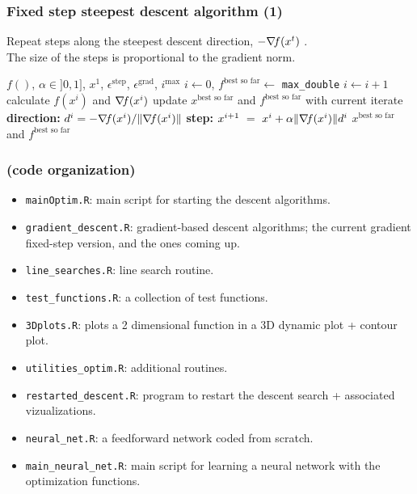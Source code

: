 \documentclass[12pt]{beamer}
\begin{document}
\begin{frame}
\frametitle{Fixed step steepest descent algorithm (1)} 
Repeat steps along the steepest descent direction, $-\nabla\!{f}(x^t)$ \cite{cauchy1847methode}. \\
The size of the steps is proportional to the gradient norm.
\begin{block}{}
\begin{algorithmic}
\REQUIRE $f()$, $\alpha \in ]0,1]$, $x^1$, $\epsilon^{\text{step}}$, $\epsilon^{\text{grad}}$, $i^{\text{max}}$
\STATE $i\leftarrow 0$, $f^{\text{best so far}} \leftarrow $ \texttt{max\_double}
\REPEAT 
\STATE $i \leftarrow i+1$
\STATE calculate $f(x^i)$ and $\nabla\!{f}(x^i)$
\STATE update $x^{\text{best so far}}$ and $f^{\text{best so far}}$ with current iterate
\ENDIF
\STATE \textbf{direction: } $d^i = - \nabla\!{f}(x^i) / \lVert \nabla\!{f}(x^i) \rVert$
\STATE \textbf{step: } $x^{i+1} ~=~ x^i + \alpha \lVert \nabla\!{f}(x^i) \rVert d^i$
\RETURN $x^{\text{best so far}}$ and $f^{\text{best so far}}$
\end{algorithmic}
\end{block}
\end{frame}

\begin{frame}
\frametitle{(code organization)} 
\begin{itemize}
\item \texttt{mainOptim.R}: main script for starting the descent algorithms.
\item \texttt{gradient\_descent.R}: gradient-based descent algorithms; the current gradient fixed-step version, and the ones coming up.
\item \texttt{line\_searches.R}: line search routine.
\item \texttt{test\_functions.R}: a collection of test functions.
\item \texttt{3Dplots.R}: plots a 2 dimensional function in a 3D dynamic plot + contour plot.
\item \texttt{utilities\_optim.R}: additional routines.
\item \texttt{restarted\_descent.R}: program to restart the descent search + associated vizualizations.
\item \texttt{neural\_net.R}: a feedforward network coded from scratch.
\item \texttt{main\_neural\_net.R}: main script for learning a neural network with the optimization functions.
\end{itemize}
\end{frame}
\end{document}
